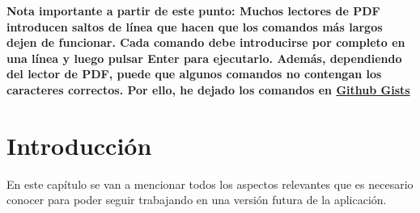 \textbf{Nota importante a partir de este punto: Muchos lectores de PDF introducen saltos de línea que hacen que los comandos más largos dejen de funcionar. Cada comando debe introducirse por completo en una línea y luego pulsar Enter para ejecutarlo. Además, dependiendo del lector de PDF, puede que algunos comandos no contengan los caracteres correctos. Por ello, he dejado los comandos en \href{https://gist.github.com/rogama25/3f7754431ae2acbdcab625117e012432}{Github Gists}}

\section{Introducción}
En este capítulo se van a mencionar todos los aspectos relevantes que es necesario conocer para poder seguir trabajando en una versión futura de la aplicación.

